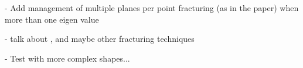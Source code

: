 \documentclass[tog]{acmsiggraph}
\begin{document}
- Add management of multiple planes per point fracturing (as in the paper) when more than one eigen value

- talk about \cite{Parker:2009:RTD}, \cite{Rivers:2007:FFL} and maybe other fracturing techniques

- Test with more complex shapes... 






  
\end{document}
